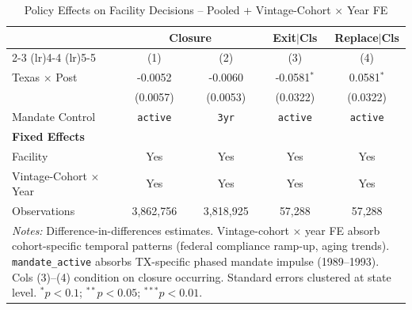 \begin{table}[htbp]
\centering
\caption{Policy Effects on Facility Decisions -- Pooled + Vintage-Cohort $\times$ Year FE}
\label{tbl:reg-closure}
\begin{tabular}{lcccc}
\toprule
 & \multicolumn{2}{c}{\textbf{Closure}} & \textbf{Exit$|$Cls} & \textbf{Replace$|$Cls} \\
\cmidrule(lr){2-3} \cmidrule(lr){4-4} \cmidrule(lr){5-5}
 & (1) & (2) & (3) & (4) \\
\midrule
Texas $\times$ Post & -0.0052 & -0.0060 & -0.0581$^{*}$ & 0.0581$^{*}$ \\
& (0.0057) & (0.0053) & (0.0322) & (0.0322) \\
\midrule
Mandate Control & \texttt{active} & \texttt{3yr} & \texttt{active} & \texttt{active} \\
\midrule
\textbf{Fixed Effects} & & & & \\
Facility & Yes & Yes & Yes & Yes \\
Vintage-Cohort $\times$ Year & Yes & Yes & Yes & Yes \\
\midrule
Observations & 3,862,756 & 3,818,925 & 57,288 & 57,288 \\
\bottomrule
\multicolumn{5}{p{0.95\textwidth}}{\footnotesize \textit{Notes:}
Difference-in-differences estimates. Vintage-cohort $\times$ year FE absorb
cohort-specific temporal patterns (federal compliance ramp-up, aging trends).
\texttt{mandate\_active} absorbs TX-specific phased mandate impulse (1989--1993).
Cols (3)--(4) condition on closure occurring.
Standard errors clustered at state level.
$^{*}p<0.1$; $^{**}p<0.05$; $^{***}p<0.01$.}
\end{tabular}
\end{table}
